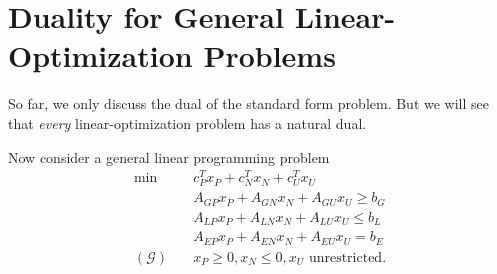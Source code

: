 \section{Duality for General Linear-Optimization Problems}
So far, we only discuss the dual of the standard form problem. But we will see that \emph{every} linear-optimization problem has a natural dual.

Now consider a general linear programming problem
\begin{align*}
	\min~              & c^{T}_P x_P + c^{T}_N x_N + c^{T}_U x_U          \\
	                   & A_{GP}x_P +A_{GN}x_N + A_{GU}x_U\geq b_G         \\
	                   & A_{LP}x_P +A_{LN}x_N + A_{LU}x_U \leq b_L        \\
	                   & A_{EP}x_P +A_{EN}x_N + A_{EU}x_U = b_E           \\
	(\mathcal{G})\quad & x_P\geq 0, x_N \leq 0, x_U \text{ unrestricted}.
\end{align*}

